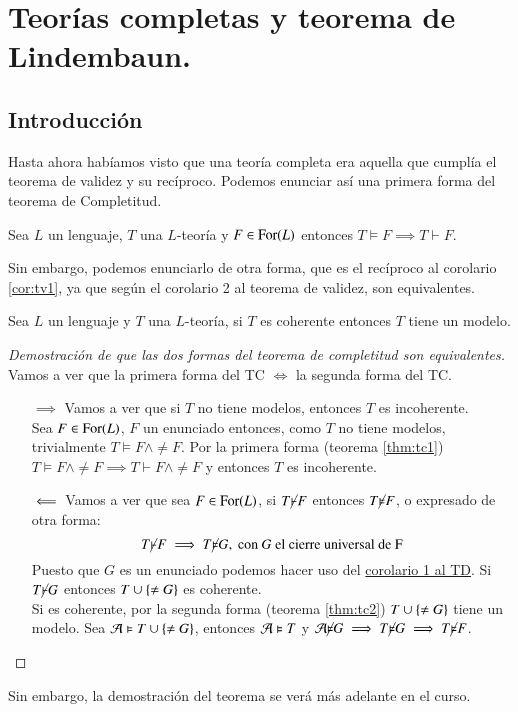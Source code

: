 
\chapter{Teorías completas y teorema de Lindembaun.}

\section{Introducción}

Hasta ahora habíamos visto que una teoría completa era aquella que cumplía el teorema de validez y su recíproco. Podemos enunciar así una primera forma del teorema de Completitud.

\begin{thm}\label{thm:tc1}
    Sea $L$ un lenguaje, $T$ una $L$-teoría y $F \in \mathrm{For}(L)$ entonces $T \vDash F \implies T \vdash F$.
\end{thm}

Sin embargo, podemos enunciarlo de otra forma, que es el recíproco al corolario \ref{cor:tv1}, ya que según el corolario 2 al teorema de validez, son equivalentes.
\begin{thm}\label{thm:tc2}
    Sea $L$ un lenguaje y $T$ una $L$-teoría, si $T$ es coherente entonces $T$ tiene un modelo.
\end{thm}


\begin{proof}[Demostración de que las dos formas del teorema de completitud son equivalentes]
    Vamos a ver que la primera forma del TC $\iff$ la segunda forma del TC.
    \begin{itemize}
        \item[$\implies$] Vamos a ver que si $T$ no tiene modelos, entonces $T$ es incoherente.\\
        Sea $F \in \mathrm{For}(L)$, $F$ un enunciado entonces, como $T$ no tiene modelos, trivialmente $T \vDash F \land \neq F$. Por la primera forma (teorema \ref{thm:tc1}) $T \vDash F \land \neq F \implies T \vdash F \land \neq F$ y entonces $T$ es incoherente.

        \item[$\ \Longleftarrow\ $] Vamos a ver que sea $F \in \mathrm{For}(L)$, si $T \cancel\vdash F$ entonces $T \cancel\vDash F$, o expresado de otra forma:
        $$
            T \cancel\vdash F \implies T \cancel\vDash G, \text{ con $G$ el cierre universal de F}
        $$
        Puesto que $G$ es un enunciado podemos hacer uso del \hyperref[cor:td1]{corolario 1 al TD}. Si $T \cancel\vdash G$ entonces $T \cup \left\{\neq G\right\}$ es coherente.\\
        Si es coherente, por la segunda forma (teorema \ref{thm:tc2}) $T \cup \left\{\neq G\right\}$ tiene un modelo. Sea $\mathcal{A} \vDash T \cup \left\{\neq G\right\}$, entonces $\mathcal{A} \vDash T$ y $\mathcal{A} \cancel\vDash G \implies T \cancel\vDash G \implies T \cancel\vDash F$.
    \end{itemize}
\end{proof}
Sin embargo, la demostración del teorema se verá más adelante en el curso.



